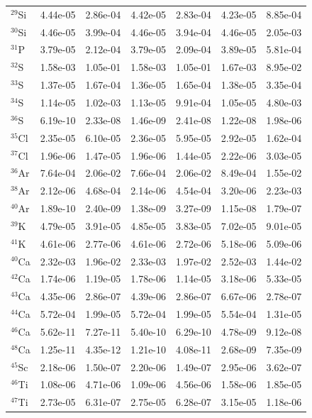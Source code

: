 \begin{table}
\begin{tabular}{l|cc|cc|cc}
$^{29}$Si & 4.44e-05 & 2.86e-04 & 4.42e-05 & 2.83e-04 & 4.23e-05 & 8.85e-04\\
$^{30}$Si & 4.46e-05 & 3.99e-04 & 4.46e-05 & 3.94e-04 & 4.46e-05 & 2.05e-03\\
$^{31}$P & 3.79e-05 & 2.12e-04 & 3.79e-05 & 2.09e-04 & 3.89e-05 & 5.81e-04\\
$^{32}$S & 1.58e-03 & 1.05e-01 & 1.58e-03 & 1.05e-01 & 1.67e-03 & 8.95e-02\\
$^{33}$S & 1.37e-05 & 1.67e-04 & 1.36e-05 & 1.65e-04 & 1.38e-05 & 3.35e-04\\
$^{34}$S & 1.14e-05 & 1.02e-03 & 1.13e-05 & 9.91e-04 & 1.05e-05 & 4.80e-03\\
$^{36}$S & 6.19e-10 & 2.33e-08 & 1.46e-09 & 2.41e-08 & 1.22e-08 & 1.98e-06\\
$^{35}$Cl & 2.35e-05 & 6.10e-05 & 2.36e-05 & 5.95e-05 & 2.92e-05 & 1.62e-04\\
$^{37}$Cl & 1.96e-06 & 1.47e-05 & 1.96e-06 & 1.44e-05 & 2.22e-06 & 3.03e-05\\
$^{36}$Ar & 7.64e-04 & 2.06e-02 & 7.66e-04 & 2.06e-02 & 8.49e-04 & 1.55e-02\\
$^{38}$Ar & 2.12e-06 & 4.68e-04 & 2.14e-06 & 4.54e-04 & 3.20e-06 & 2.23e-03\\
$^{40}$Ar & 1.89e-10 & 2.40e-09 & 1.38e-09 & 3.27e-09 & 1.15e-08 & 1.79e-07\\
$^{39}$K & 4.79e-05 & 3.91e-05 & 4.85e-05 & 3.83e-05 & 7.02e-05 & 9.01e-05\\
$^{41}$K & 4.61e-06 & 2.77e-06 & 4.61e-06 & 2.72e-06 & 5.18e-06 & 5.09e-06\\
$^{40}$Ca & 2.32e-03 & 1.96e-02 & 2.33e-03 & 1.97e-02 & 2.52e-03 & 1.44e-02\\
$^{42}$Ca & 1.74e-06 & 1.19e-05 & 1.78e-06 & 1.14e-05 & 3.18e-06 & 5.33e-05\\
$^{43}$Ca & 4.35e-06 & 2.86e-07 & 4.39e-06 & 2.86e-07 & 6.67e-06 & 2.78e-07\\
$^{44}$Ca & 5.72e-04 & 1.99e-05 & 5.72e-04 & 1.99e-05 & 5.54e-04 & 1.31e-05\\
$^{46}$Ca & 5.62e-11 & 7.27e-11 & 5.40e-10 & 6.29e-10 & 4.78e-09 & 9.12e-08\\
$^{48}$Ca & 1.25e-11 & 4.35e-12 & 1.21e-10 & 4.08e-11 & 2.68e-09 & 7.35e-09\\
$^{45}$Sc & 2.18e-06 & 1.50e-07 & 2.20e-06 & 1.49e-07 & 2.95e-06 & 3.62e-07\\
$^{46}$Ti & 1.08e-06 & 4.71e-06 & 1.09e-06 & 4.56e-06 & 1.58e-06 & 1.85e-05\\
$^{47}$Ti & 2.73e-05 & 6.31e-07 & 2.75e-05 & 6.28e-07 & 3.15e-05 & 1.18e-06\\

\end{tabular}
\end{table}
